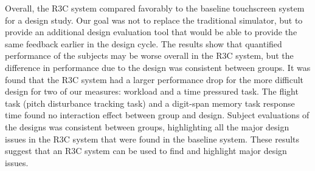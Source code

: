Overall, the R3C system compared favorably to the baseline touchscreen system for a design study.
Our goal was not to replace the traditional simulator, but to provide an additional design evaluation tool that would be able to provide the same feedback earlier in the design cycle.
The results show that quantified performance of the subjects may be worse overall in the R3C system, but the difference in performance due to the design was consistent between groups.
It was found that the R3C system had a larger performance drop for the more difficult design for two of our measures: workload and a time pressured task.
The flight task (pitch disturbance tracking task) and a digit-span memory task response time found no interaction effect between group and design.
Subject evaluations of the designs was consistent between groups, highlighting all the major design issues in the R3C system that were found in the baseline system.
These results suggest that an R3C system can be used to find and highlight major design issues.
